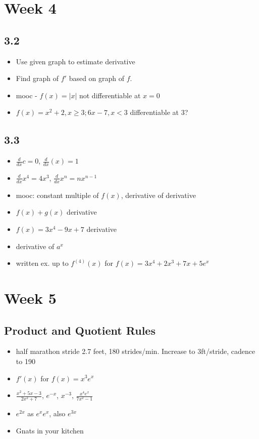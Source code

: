 \documentclass[11pt]{article}
\begin{document}
\section*{Week 4}

\subsection{3.2}
\begin{itemize}
	\item Use given graph to estimate derivative
	\item Find graph of $f'$ based on graph of $f$.
	\item mooc - $f(x) = \vert x \vert$ not differentiable at $x = 0$
	\item $f(x) = x^2 + 2, x \geq 3; 6x-7, x < 3$ differentiable at 3?
\end{itemize}

\subsection{3.3}
\begin{itemize}
	\item $\frac{d}{dx} c = 0$, $\frac{d}{dx} (x) = 1$
	\item $\frac{d}{dx} x^4 = 4x^3$, $\frac{d}{dx} x^n = nx^{n-1}$
	\item mooc: constant multiple of $f(x)$, derivative of derivative
	\item $f(x) + g(x)$ derivative
	\item $f(x) = 3x^4 - 9x + 7$ derivative
	\item derivative of $a^x$
	\item written ex. up to $f^{(4)}(x)$ for $f(x) = 3x^4 + 2x^3 + 7x + 5e^x$
\end{itemize}




\section*{Week 5}

\subsection{Product and Quotient Rules}
\begin{itemize}
	\item half marathon stride 2.7 feet, 180 strides/min.  Increase to 3ft/stride, cadence to 190
	\item $f'(x)$ for $f(x) = x^3e^x$
	\item $\frac{x^2 + 5x - 3}{2x^2 + 7}$, $e^{-x}$, $x^{-3}$, $\frac{x^4e^x}{7x^2 -1 }$
	\item $e^{2x}$ as $e^x e^x$, also $e^{3x}$
	\item Gnats in your kitchen
\end{itemize}
\end{document}
